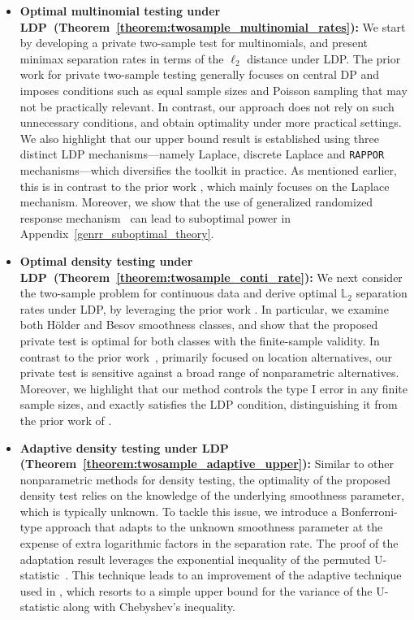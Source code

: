 \documentclass[twoside,11pt]{article}
\begin{document}
\begin{itemize}
	\item \textbf{Optimal multinomial testing under LDP~(Theorem~\ref{theorem:twosample_multinomial_rates}):} We start by developing a private two-sample test for multinomials, and present minimax separation rates in terms of the $\ell_2$ distance under LDP. The prior work \citep{Acharya2018dPGofTwosample, Aliakbarpour2019PrivatePermutations,Aliakbarpour2018DPgof} for private two-sample testing generally focuses on central DP and imposes conditions such as equal sample sizes and Poisson sampling that may not be practically relevant. In contrast, our approach does not rely on such unnecessary conditions, and obtain optimality under more practical settings. We also highlight that our upper bound result is established using three distinct LDP mechanisms{---}namely Laplace, discrete Laplace and \texttt{RAPPOR} mechanisms{---}which diversifies the toolkit in practice. As mentioned earlier, this is in contrast to the prior work \citep{Lam-Weil2021MinimaxConstraint,Dubois2022}, which mainly focuses on the Laplace mechanism. Moreover, we show that the use of generalized randomized response mechanism~\citep{Gaboardi2018LDPChisq} can lead to suboptimal power in Appendix~\ref{genrr_suboptimal_theory}. 
	\item \textbf{Optimal density testing under LDP~(Theorem~\ref{theorem:twosample_conti_rate}):} We next consider the two-sample problem for continuous data and derive optimal $\mathbb{L}_2$ separation rates under LDP, by leveraging the prior work \citep{Lam-Weil2021MinimaxConstraint, kim_minimax_2022}. In particular, we examine both H\"{o}lder and Besov smoothness classes, and show that the proposed private test is optimal for both classes with the finite-sample validity. In contrast to the prior work~\citep{Ding2018TwosampleMean, Waudby-Smith2022LDPTwosample}, primarily focused on location alternatives, our private test is sensitive against a broad range of nonparametric alternatives. Moreover, we highlight that our method controls the type I error in any finite sample sizes, and exactly satisfies the LDP condition, distinguishing it from the prior work of \cite{Raj2020ATest}.
	\item \textbf{Adaptive density testing under LDP (Theorem~\ref{theorem:twosample_adaptive_upper}):} Similar to other nonparametric methods for density testing, the optimality of the proposed density test relies on the knowledge of the underlying smoothness parameter, which is typically unknown. To tackle this issue, we introduce a Bonferroni-type approach that adapts to the unknown smoothness parameter at the expense of extra logarithmic factors in the separation rate. The proof of the adaptation result leverages the exponential inequality of the permuted U-statistic~\citep{kim_minimax_2022}. This technique leads to an improvement of the adaptive technique used in \citet{Lam-Weil2021MinimaxConstraint}, which resorts to a simple upper bound for the variance of the U-statistic along with Chebyshev's inequality.
	

\end{itemize}
\end{document}
